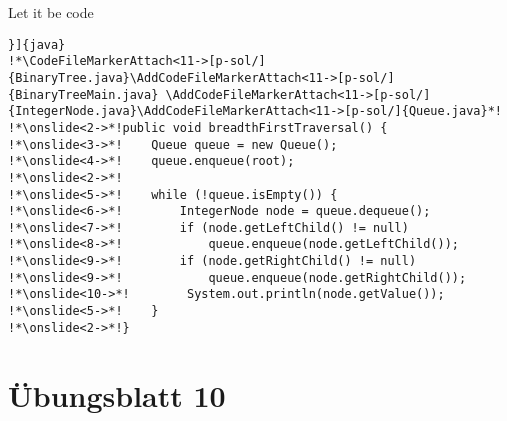 \begin{frame}[fragile,c]{Let it be code}
\begin{verbatim}}]{java}
!*\CodeFileMarkerAttach<11->[p-sol/]{BinaryTree.java}\AddCodeFileMarkerAttach<11->[p-sol/]{BinaryTreeMain.java} \AddCodeFileMarkerAttach<11->[p-sol/]{IntegerNode.java}\AddCodeFileMarkerAttach<11->[p-sol/]{Queue.java}*!
!*\onslide<2->*!public void breadthFirstTraversal() {
!*\onslide<3->*!    Queue queue = new Queue();
!*\onslide<4->*!    queue.enqueue(root);
!*\onslide<2->*!
!*\onslide<5->*!    while (!queue.isEmpty()) {
!*\onslide<6->*!        IntegerNode node = queue.dequeue();
!*\onslide<7->*!        if (node.getLeftChild() != null)
!*\onslide<8->*!            queue.enqueue(node.getLeftChild());
!*\onslide<9->*!        if (node.getRightChild() != null)
!*\onslide<9->*!            queue.enqueue(node.getRightChild());
!*\onslide<10->*!        System.out.println(node.getValue());
!*\onslide<5->*!    }
!*\onslide<2->*!}
\end{verbatim}
\end{frame}

\section{Übungsblatt 10}
